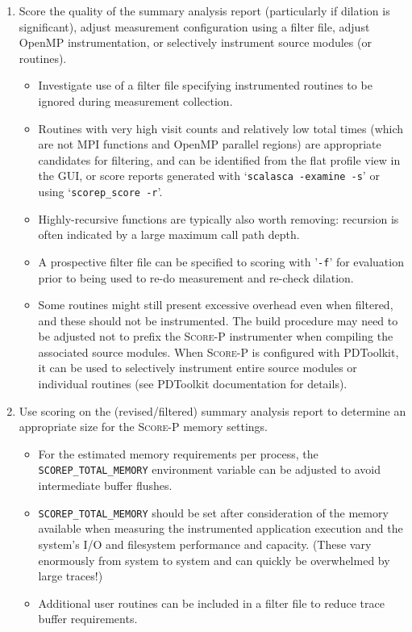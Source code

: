 \documentclass[a4paper]{article}
\newcommand{\Scorep}{\textsc{Score-P}\xspace}
\begin{document}
\begin{enumerate}
\item Score the quality of the summary analysis report (particularly if
dilation is significant),  adjust measurement configuration using a
filter file, adjust OpenMP instrumentation, or selectively instrument
source modules (or routines).

\begin{itemize}
\item Investigate use of a filter file specifying instrumented routines
to be ignored during measurement collection.
\item Routines with very high visit counts and relatively low total
times (which are not MPI functions and OpenMP parallel regions) 
are appropriate candidates for filtering, and can be identified from the
flat profile view in the GUI, or score reports generated with 
`\verb+scalasca -examine -s+' or using `\verb+scorep_score -r+'.
\item Highly-recursive functions are typically also worth removing:
recursion is often indicated by a large maximum call path depth.
\item A prospective filter file can be specified to scoring with '\verb+-f+'
for evaluation prior to being used to re-do measurement and re-check dilation.
\item Some routines might still present excessive overhead even when
filtered, and these should not be instrumented.  The build
procedure may need to be adjusted not to prefix the \Scorep
instrumenter when compiling the associated source modules.
When \Scorep is configured with PDToolkit, it can be used to selectively instrument
entire source modules or individual routines (see PDToolkit documentation for details).
\end{itemize}

\item Use scoring on the (revised/filtered) summary analysis report
to determine an appropriate size for the \Scorep memory settings.

\begin{itemize}
\item For the estimated memory requirements per process, the \verb+SCOREP_TOTAL_MEMORY+ 
environment variable can be adjusted to avoid intermediate buffer flushes. 
\item \verb+SCOREP_TOTAL_MEMORY+ should be set after consideration of the
memory available when measuring the instrumented application execution
and the system's I/O and filesystem performance and capacity.  (These
vary enormously from system to system and can quickly be overwhelmed by
large traces!)
\item Additional user routines can be included in a filter file to
reduce trace buffer requirements.
\end{itemize}


\end{enumerate}
\end{document}
